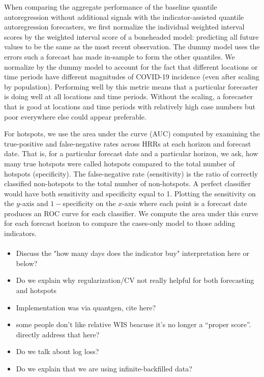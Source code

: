 \documentclass[9pt,twocolumn,twoside,lineno]{pnas-new}
\begin{document}
When comparing the aggregate performance of the baseline quantile autoregression
without additional signals with 
the indicator-assisted quantile autoregression forecasters, we first
normalize the individual weighted interval scores by the weighted interval
score of a boneheaded model: predicting all future values to be the same as the
most recent observation. The dummy model uses the errors such a forecast has
made in-sample to form the other quantiles. We normalize by 
the dummy model to account for the fact that different locations or
time periods have different magnitudes of COVID-19 incidence (even after
scaling by population). Performing well by this metric means that a particular
forecaster is doing well at all locations and time periods. Without the scaling,
a forecaster that is good at locations and time periods with relatively high
case numbers but poor everywhere else could appear preferable. 

For hotspots, we use the area under the curve (AUC) computed by examining the
true-positive and false-negative rates across HRRs at each horizon and forecast
date. That is, for a particular forecast date and a particular horizon, we ask,
how many true hotspots were called hotspots compared to the total number of
hotspots (specificity). The false-negative rate (sensitivity) is the ratio of
correctly classified non-hotspots to the total number of non-hotspots. A perfect
classifier would have both sensitivity and specificity equal to 1. Plotting the
sensitivity on the $y$-axis and $1-$specificity on the $x$-axis where each point
is a forecast date produces an ROC curve for each classifier. We compute the
area under this curve for each forecast horizon to compare the cases-only model
to those adding indicators. 




\paragraph{}

\begin{itemize}
\item Discuss the "how many days does the indicator buy" interpretation here or below? 


\item Do we explain why regularization/CV not really helpful for both
forecasting and hotspots


\item Implementation was via quantgen, cite here?

\item some people don't like relative WIS beacuse it's no longer a
``proper score''.  directly address that here?


\item Do we talk about log loss?

\item Do we explain that we are using infinite-backfilled data?


\end{itemize}
\end{document}
